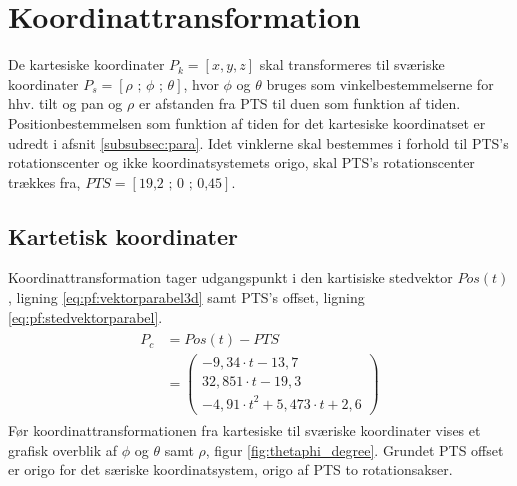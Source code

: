 \section{Koordinattransformation}
\label{sec:koordinattransformation}

De kartesiske koordinater \(P_k=[x, y, z]\) skal transformeres til sværiske koordinater \(P_s=[\rho \text{ ; } \phi \text{ ; } \theta]\), hvor \(\phi\) og \(\theta\) bruges som vinkelbestemmelserne for hhv. tilt og pan og \(\rho\) er afstanden fra PTS til duen som funktion af tiden.
Positionbestemmelsen som funktion af tiden for det kartesiske koordinatset er udredt i afsnit \ref{subsubsec:para}.
Idet vinklerne skal bestemmes i forhold til PTS's rotationscenter og ikke koordinatsystemets origo, skal PTS's rotationscenter trækkes fra, \(PTS=[\text{19,2 ; 0 ; 0,45}]\). 

\subsection{Kartetisk koordinater}
Koordinattransformation tager udgangspunkt i den kartisiske stedvektor \(Pos(t) \), ligning \ref{eq:pf:vektorparabel3d} samt PTS's offset, ligning \ref{eq:pf:stedvektorparabel}.
\begin{align}
\begin{split}
{ P }_{ c }&=Pos\left( t \right) -PTS
\\
&= \left( \begin{matrix} - 9,34\cdot t-13,7 \\
  32,851\cdot t-19,3 \\ 
 -{ 4,91\cdot t }^{ 2 }+5,473\cdot t+2,6\end{matrix} \right) 
\label{eq:pf:stedvektorparabel}
\end{split}
\end{align}
Før koordinattransformationen fra kartesiske til sværiske koordinater vises et grafisk overblik af \(\phi\) og \(\theta\) samt \(\rho\), figur \ref{fig:thetaphi_degree}. Grundet PTS offset er origo for det særiske koordinatsystem, origo af PTS to rotationsakser. 

